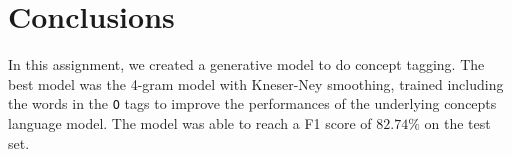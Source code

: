 \section{Conclusions}
\label{sec:conclusions}

In this assignment, we created a generative model to do concept tagging.
The best model was the 4-gram model with Kneser-Ney smoothing, trained including the words in the \texttt{O} tags to improve the performances of the underlying concepts language model.
The model was able to reach a F1 score of $82.74\%$ on the test set.
